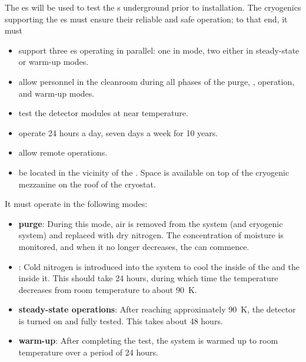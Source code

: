 \label{sec:fdsp-tc-cryocoldbox}


The  \coldbox{}es will be used to test the s underground prior to installation.  
The cryogenics supporting the \coldbox{}es  must ensure their reliable and safe operation; to that end, it must
\begin{itemize}
\setlength\itemsep{1mm}
\setlength{\parsep}{1mm}
\setlength{\itemsep}{-5mm}
\item support three \coldbox{}es operating in parallel: %
one in \cooldown mode, two either in steady-state or warm-up modes.
\item allow personnel in the cleanroom during all phases of the purge, \cooldown, operation, and warm-up modes. 
\item test the detector modules at near  temperature.
\item operate 24 hours a day, seven days a week for 10 years.
\item allow remote operations.
\item be located in the vicinity of the . Space is available on top of the cryogenic mezzanine on the roof of the cryostat.
\end{itemize}

It must operate in the following modes: %

\begin{itemize}
\setlength\itemsep{1mm}
\setlength{\parsep}{1mm}
\setlength{\itemsep}{-5mm}
\item \textbf{purge}: During this mode, air is removed from the system (\coldbox and cryogenic system) and replaced with dry nitrogen. The concentration of moisture is monitored, and when it no longer decreases, the \cooldown can commence.
\item \textbf{\cooldown}: Cold nitrogen is introduced into the system to cool the inside of the \coldbox and the  inside it. %
This should take 24 hours, during which time the temperature decreases from room temperature to about \SI{90}{K}. 
\item \textbf{steady-state operations}: After reaching %
approximately \SI{90}{K}, %
the detector is turned on and fully tested. %
This takes about 48 hours.
\item \textbf{warm-up}: After completing the test, the system is %
warmed up to room temperature over a period of 24 hours. %
\end{itemize}

